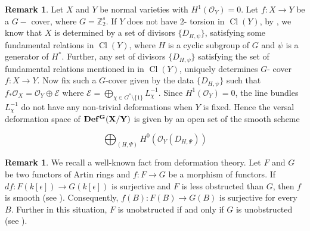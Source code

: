 \documentclass[12pt,twoside,]{amsart}
\theoremstyle{plain}
\theoremstyle{definition}
\newtheorem{remark}[theorem]{Remark}
\begin{document}
\begin{remark}\label{def that are abelian}
 Let $X$ and $Y$ be normal varieties with $H^1(\mathcal{O}_Y) = 0$. Let $f: X \to Y$ be a $G-$ cover, where $G = \mathbb{Z}_2^s$. If $Y$ does not have $2$- torsion in $\operatorname{Cl}(Y)$, by , we know that $X$ is determined by a set of divisors $\{D_{H,\psi}\}$, satisfying some fundamental relations in $\operatorname{Cl}(Y)$, where $H$ is a cyclic subgroup of $G$ and $\psi$ is a generator of $H^*$. Further, any set of divisors $\{D_{H,\psi}\}$ satisfying the set of fundamental relations mentioned in  in $\operatorname{Cl}(Y)$, uniquely determines $G$- cover $f: X \to Y$. Now fix such a $G$-cover given by the data $\{D_{H,\psi}\}$ such that $f_*\mathcal{O}_X = \mathcal{O}_Y \oplus \mathcal{E}$ where $\mathcal{E} = \bigoplus_{\chi \in G^* \setminus \{1\}} L_{\chi}^{-1}$. Since $H^1(\mathcal{O}_Y) = 0$, the line bundles $L_{\chi}^{-1}$ do not have any non-trivial deformations when $Y$ is fixed. Hence the versal deformation space of $\bf Def^G(X/Y)$ is given by an open set of the smooth scheme 

 $$\bigoplus_{(H, \Psi)} H^0(\mathcal{O}_Y(D_{H,\Psi}))$$
 
 
\end{remark}

\begin{remark}\label{smoothness}
We recall a well-known fact from deformation theory. Let $F$ and $G$ be two functors of Artin rings and $f: F \to G$ be a morphism of functors. If $df: F(k[\epsilon]) \to G(k[\epsilon])$ is surjective and $F$ is less obstructed than $G$, then $f$ is smooth (see \cite[Proposition $2.3.6$]{sernesi2006deformations}). Consequently, $f(B): F(B) \to G(B)$ is surjective for every $B$. Further in this situation, $F$ is unobstructed if and only if $G$ is unobstructed (see \cite[Proposition $2.2.5$ (ii), (iii)]{sernesi2006deformations}).

\end{remark}
\end{document}

